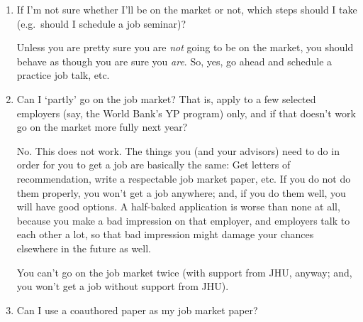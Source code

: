 \documentclass{econtex}
\begin{document}
\begin{enumerate}
\begin{comment}
  Furthermore, if their dissertation defense occurs before the
  deadline for the `on-the-market' decision in the following year (mid
  October), the student can apply to jobs themselves (with the usual
  process, including advisors writing letters and giving them to the
  \JMStaff, etc), but without their name being officially
  included in list of `on-the-market' students.  They can also have a page on the dept
  website to which they can refer employers, but will not be included
  in the list of students ``on the market'' clickable from the main
  dept web page.  The
  situation will be explained candidly to employers as resulting from
  our inflexible rule that students must be on the market in their 6th
  year or earlier.  This is what we did with Farhan Hameed this year,
  and he did eventually get a couple of mediocre job offers, one of
  which he has accepted.

\end{comment}


\item If I'm not sure whether I'll be on the market or not,
which steps should I take (e.g.\ should I schedule a job 
seminar)?

Unless you are pretty sure you are {\it not} going to be on the
market, you should behave as though you are sure you {\it are}.  So,
yes, go ahead and schedule a practice job talk, etc.

\item Can I `partly' go on the job market?  That is, apply to a few
selected employers (say, the World Bank's YP program) only, and 
if that doesn't work go on the market more fully next year?

No.  This does not work.  The things you (and your advisors) need to do in order for you to
get a job are basically the same: Get letters of recommendation, 
write a respectable job market paper, etc.  If you do not do them
properly, you won't get a job anywhere; and, if you do them well,
you will have good options.  A half-baked application is worse than
none at all, because you make a bad impression on that employer, and 
employers talk to each other a lot, so that bad impression might damage
your chances elsewhere in the future as well.  

You can't go on the job market twice (with support from JHU, anyway; and, you won't
get a job without support from JHU).

\item Can I use a coauthored paper as my job market paper?
  

\end{enumerate}
\end{document}

